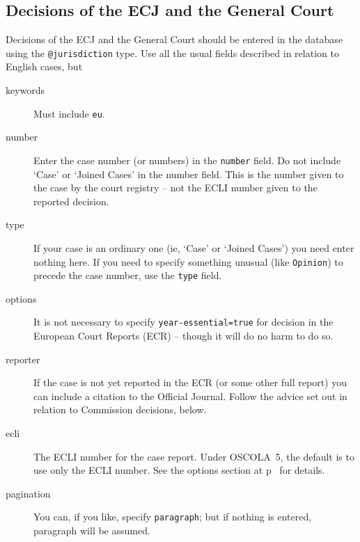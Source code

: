 \documentclass[a4paper,
               11pt,
	       DIV=1,			   
	       footinclude=false]
	      {scrartcl}
\begin{document}
\subsection{Decisions of the ECJ and the General Court}
Decisions of the ECJ and the General Court should be entered in the
database using the \texttt{@jurisdiction} type. Use all the usual
fields described in relation to English cases, but
\begin{description}
\item[keywords] Must include \texttt{eu}.
\item[number]
  Enter the case number (or numbers) in the
  \texttt{number} field. Do not include `Case' or `Joined Cases' in the number field. This
  is the number given to the case by the court registry -- not the ECLI number given
  to the reported decision.
\item[type] If your case is an ordinary one (ie, `Case' or `Joined
  Cases') you need enter nothing here. If you need to specify
  something unusual (like \texttt{Opinion}) to precede the case
  number, use the \texttt{type} field.
\item[options] It is not necessary to specify
  \texttt{year-essential=true} for decision in the European Court
  Reports (ECR) -- though it will do no harm to do so.
\item[reporter] If the case is not yet reported in the ECR (or
  some other full report) you can include a citation to the Official
  Journal. Follow the advice set out in relation to Commission
  decisions, below.
\item[ecli]
  The ECLI number for the case report. Under OSCOLA~5, the default
  is to use only the ECLI number. See the options section at
  p~\pageref{options} for details.
\item[pagination] You can, if you like, specify \texttt{paragraph};
  but if nothing is entered, paragraph will be assumed.
\end{description}
\end{document}
